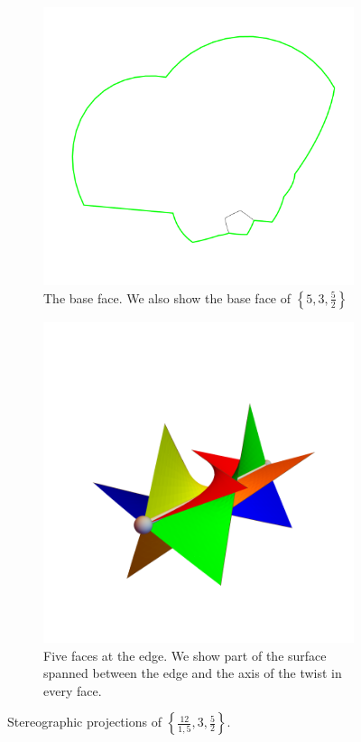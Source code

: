 \documentclass{article}
\theoremstyle{definition}
\begin{document}
\begin{figure}[H]
	\begin{center}
		\begin{subfigure}{\linewidth}
			\centering
			\includegraphics[width=0.8\linewidth]{fig3a}
			\caption{The base face. We also show the base face of $\left\{5,3,\frac{5}{2}\right\}$}\label{fig:13a}
		\end{subfigure}
		\begin{subfigure}{\linewidth}
			\centering
			\includegraphics[width=0.5\linewidth]{fig3b}
			\caption{Five faces at the edge. We show part of the surface spanned between the edge and the axis of the twist in every face.}\label{fig:13b}
		\end{subfigure}
	\end{center}
	\caption{Stereographic projections of  $\left\{\frac{12}{1,5},3,\frac{5}{2}\right\}$.}\label{fig:13}
\end{figure}
\end{document}
